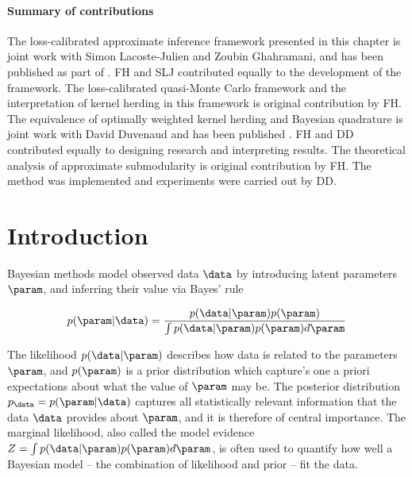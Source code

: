 \paragraph{Summary of contributions} The loss-calibrated approximate inference framework presented in this chapter is joint work with Simon Lacoste-Julien and Zoubin Ghahramani, and has been published as part of \citep{Lacoste2011}. FH and SLJ contributed equally to the development of the framework. The loss-calibrated quasi-Monte Carlo framework and the interpretation of kernel herding in this framework is original contribution by FH. The equivalence of optimally weighted kernel herding and Bayesian quadrature is joint work with David Duvenaud and has been published \citep{Huszar2012herding}. FH and DD contributed equally to designing research and interpreting results. The theoretical analysis of approximate submodularity is original contribution by FH. The method was implemented and experiments were carried out by DD. 


\section{Introduction}

Bayesian methods model observed data $\data$ by introducing latent parameters $\param$, and inferring their value via Bayes' rule

\begin{equation}
	p(\param\vert\data) = \frac{p(\data\vert\param) p(\param)}{\int p(\data\vert\param) p(\param) d\param}
\end{equation}

The likelihood $p(\data\vert\param)$ describes how data is related to the parameters $\param$, and $p(\param)$ is a prior distribution which capture's one a priori expectations about what the value of $\param$ may be. The posterior distribution $p_\data = p(\param\vert\data)$ captures all statistically relevant information that the data $\data$ provides about $\param$, and it is therefore of central importance. The marginal likelihood, also called the model evidence $Z = \int p(\data\vert\param) p(\param) d\param$, is often used to quantify how well a Bayesian model -- the combination of likelihood and prior -- fit the data.

